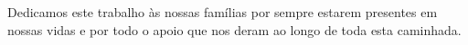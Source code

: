 Dedicamos este trabalho às nossas famílias por sempre estarem presentes em nossas vidas e por todo o apoio que nos deram ao longo de toda esta caminhada.